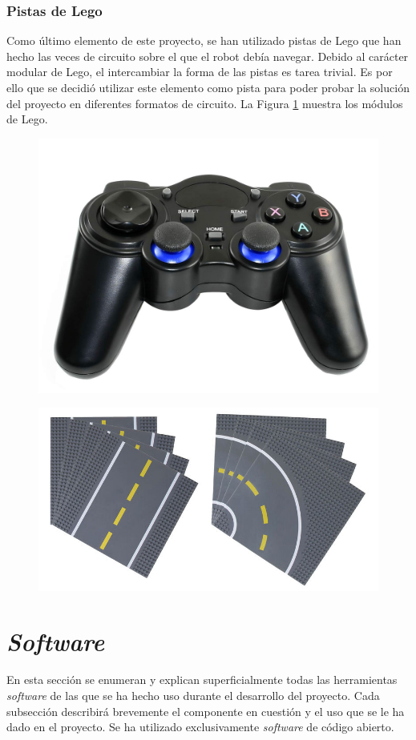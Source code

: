 \subsubsection{Pistas de Lego}

Como último elemento de este proyecto, se han utilizado pistas de Lego que han hecho las veces de circuito sobre el que el robot debía navegar. Debido al carácter modular de Lego, el intercambiar la forma de las pistas es tarea trivial. Es por ello que se decidió utilizar este elemento como pista para poder probar la solución del proyecto en diferentes formatos de circuito. La Figura \ref{fig:legos} muestra los módulos de Lego.

\begin{figure}
\centering
\begin{minipage}{.5\textwidth}
  \centering
  \includegraphics[width=.4\linewidth]{img/joystick}
  \label{fig:joystick}
\end{minipage}%
\begin{minipage}{.5\textwidth}
  \centering
  \includegraphics[width=.6\linewidth]{img/legos}
  \label{fig:legos}
\end{minipage}
\end{figure}


\section{\textit{Software}}

En esta sección se enumeran y explican superficialmente todas las herramientas \textit{software} de las que se ha hecho uso durante el desarrollo del proyecto. Cada subsección describirá brevemente el componente en cuestión y el uso que se le ha dado en el proyecto. Se ha utilizado exclusivamente \textit{software} de código abierto.

